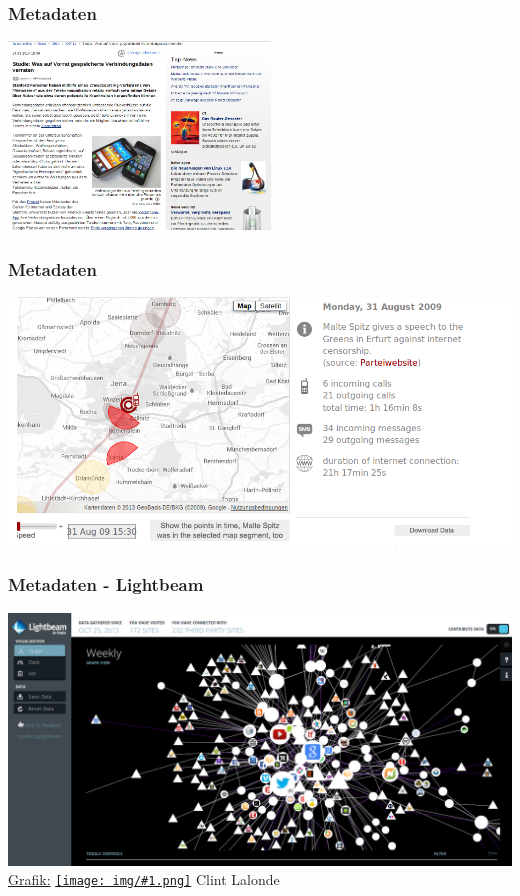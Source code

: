 \documentclass[12pt]{beamer}
\newcommand{\cc}[1]{\texttt{[image: img/\#1.png]}\hspace{1mm}}
\begin{document}
\begin{frame}
  \frametitle{Metadaten}
    \begin{center}
      \includegraphics[height=5cm]{img/metadaten_studie.png}
    \end{center}
\end{frame}

\begin{frame}
    \frametitle{Metadaten}
    \includegraphics[height=0.7\textheight]{img/maltespitz.png}
\end{frame}

\begin{frame}
    \frametitle{Metadaten - Lightbeam}
    \includegraphics[height=0.7\textheight]{img/lightbeam.png}
  \\{\small \href{http://www.flickr.com/photos/8517757@N03/10538205035/in/photolist-h4e4dg}{Grafik:} \href{http://creativecommons.org/licenses/by-sa/3.0/deed.en}{\cc{by-sa}} Clint Lalonde}
\end{frame}
\end{document}
